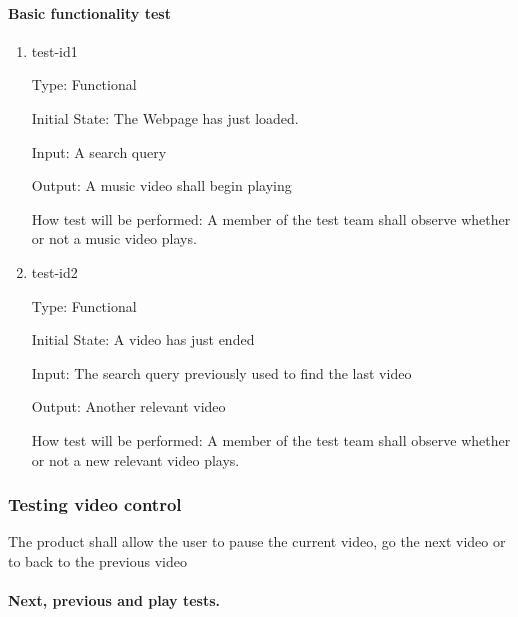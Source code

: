 \documentclass[12pt, titlepage]{article}
\begin{document}
\paragraph{Basic functionality test}

\begin{enumerate}

\item{test-id1\\}

Type: Functional
					
Initial State: The Webpage has just loaded.
					
Input: A search query
					
Output: A music video shall begin playing
					
How test will be performed: \color{red}A member of the test team shall observe whether or not a music video plays.\color{black}
					
\item{test-id2\\}

Type: Functional
					
Initial State: A video has just ended
					
Input: The search query previously used to find the last video
					
Output: Another relevant video
					
How test will be performed: \color{red}A member of the test team shall observe whether or not a new relevant video plays. \color{black}

\end{enumerate}

\subsubsection{Testing video control}

The product shall allow the user to pause the current video, go the next video or to back to the previous video

\paragraph{Next, previous and play tests.}
\end{document}
